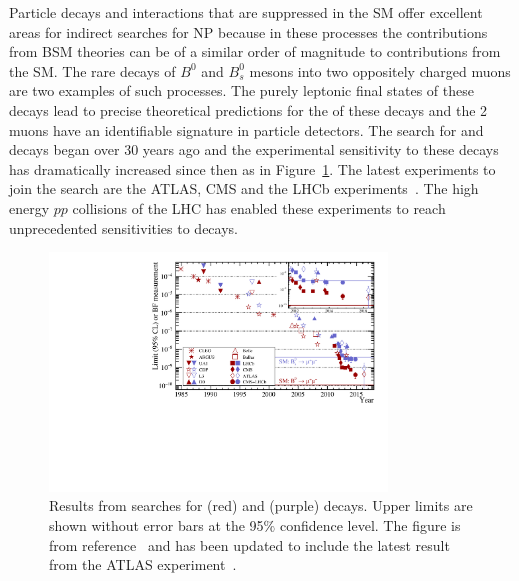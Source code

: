 Particle decays and interactions that are suppressed in the SM offer excellent areas for indirect searches for NP because in these processes the contributions from BSM theories can be of a similar order of magnitude to contributions from the SM. The rare decays of $B^{0}$ and $B^{0}_{s}$ mesons into two oppositely charged muons are two examples of such processes. The purely leptonic final states of these decays lead to precise theoretical predictions for the \BFs of these decays and the 2 muons have an identifiable signature in particle detectors. The search for \bdmumu and \bsmumu decays began over 30 years ago and the experimental sensitivity to these decays has dramatically increased since then as in Figure~\ref{fig:bmumu_history}. The latest experiments to join the search are the ATLAS, CMS and the LHCb experiments~\cite{Aad:2012pn,Aaboud:2016ire, Chatrchyan:2011kr, Chatrchyan:2012rga, Chatrchyan:2013bka, Aaij:2011rja, LHCb:2011ac,Aaij:2012ac,Aaij:2012nna,Aaij:2013aka,CMS:2014xfa}. The high energy $pp$ collisions of the LHC has enabled these experiments to reach unprecedented sensitivities to \bmumu decays. 

\begin{figure}[tbp]
    \centering
        \includegraphics[width=0.8\textwidth]{./Figs/Introduction/95_CL.pdf}
    \caption{Results from searches for \bdmumu (red) and \bsmumu (purple) decays. Upper limits are shown without error bars at the 95$\%$ confidence level. The figure is from reference~\cite{CMS:2014xfa} and has been updated to include the latest result from the ATLAS experiment~\cite{Aaboud:2016ire}.}
    \label{fig:bmumu_history}
\end{figure}

